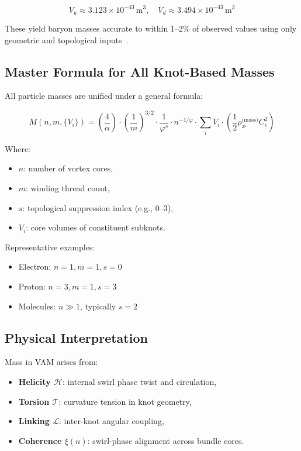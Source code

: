 \documentclass[12pt]{article}
\begin{document}
    \begin{equation}
    V_u \approx 3.123 \times 10^{-43} \, \text{m}^3, \quad V_d \approx 3.494 \times 10^{-43} \, \text{m}^3
    \end{equation}

    These yield baryon masses accurate to within 1–2\% of observed values using only geometric and topological inputs~\cite{kleckner2013creation}.

    \subsection{Master Formula for All Knot-Based Masses}

    All particle masses are unified under a general formula:

    \begin{equation}
    M(n, m, \{V_i\}) = \left( \frac{4}{\alpha} \right) \cdot \left( \frac{1}{m} \right)^{3/2} \cdot \frac{1}{\varphi^s} \cdot n^{-1/\varphi} \cdot \sum_i V_i \cdot \left( \frac{1}{2} \rho_{\text{\ae}}^{\text{(mass)}} C_e^2 \right)
    \label{eq:mass_master}
    \end{equation}

    Where:
    \begin{itemize}
        \item \( n \): number of vortex cores,
        \item \( m \): winding thread count,
        \item \( s \): topological suppression index (e.g., 0–3),
        \item \( V_i \): core volumes of constituent subknots.
    \end{itemize}

    \noindent Representative examples:
    \begin{itemize}
        \item Electron: \( n=1, m=1, s=0 \)
        \item Proton: \( n=3, m=1, s=3 \)
        \item Molecules: \( n \gg 1 \), typically \( s = 2 \)
    \end{itemize}

    \subsection{Physical Interpretation}

    Mass in VAM arises from:
    \begin{itemize}
        \item \textbf{Helicity \( \mathcal{H} \)}: internal swirl phase twist and circulation,
        \item \textbf{Torsion \( \mathcal{T} \)}: curvature tension in knot geometry,
        \item \textbf{Linking \( \mathcal{L} \)}: inter-knot angular coupling,
        \item \textbf{Coherence \( \xi(n) \)}: swirl-phase alignment across bundle cores.
    \end{itemize}
\end{document}
